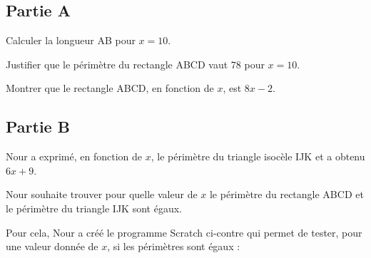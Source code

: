 \documentclass[12pt,a4paper,french]{article}
\begin{document}
\subsection*{Partie A}

\medskip

\begin{énumérer}
\article
Calculer la longueur AB pour $x = 10$.

Justifier que le périmètre du rectangle ABCD vaut $78$ pour $x = 10$.

\item Montrer que le rectangle ABCD, en fonction de $x$, est $8x - 2$.
\end{énumérer}



\subsection*{Partie B}

\medskip

Nour a exprimé, en fonction de $x$, le périmètre du triangle isocèle IJK et a obtenu $6x + 9$.

Nour souhaite trouver pour quelle valeur de $x$ le périmètre du rectangle ABCD et le périmètre du triangle IJK sont égaux.

Pour cela, Nour a créé le programme Scratch ci-contre qui permet de tester, pour une valeur donnée de $x$, si les périmètres sont égaux :

\begin{center}
\begin{scratch}[scale=0.9]
	{}
	{}
\end{scratch}
\end{center}

\medskip
\end{document}
